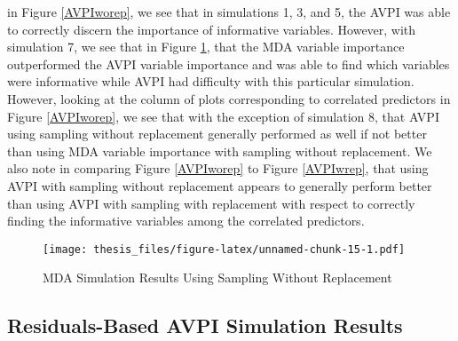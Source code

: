 \documentclass[12pt,twoside]{reedthesis}
\theoremstyle{definition}
\theoremstyle{definition}
\theoremstyle{definition}
\theoremstyle{remark}
\begin{document}
in Figure \ref{AVPIworep}, we see that in simulations 1, 3, and 5, the
AVPI was able to correctly discern the importance of informative
variables. However, with simulation 7, we see that in Figure
\ref{MDAworep1}, that the MDA variable importance outperformed the AVPI
variable importance and was able to find which variables were
informative while AVPI had difficulty with this particular simulation.
However, looking at the column of plots corresponding to correlated
predictors in Figure \ref{AVPIworep}, we see that with the exception of
simulation 8, that AVPI using sampling without replacement generally
performed as well if not better than using MDA variable importance with
sampling without replacement. We also note in comparing Figure
\ref{AVPIworep} to Figure \ref{AVPIwrep}, that using AVPI with sampling
without replacement appears to generally perform better than using AVPI
with sampling with replacement with respect to correctly finding the
informative variables among the correlated predictors. \par
\begin{figure}
\centering
\texttt{[image: thesis\_files/figure-latex/unnamed-chunk-15-1.pdf]}
\caption{\label{fig:unnamed-chunk-15}\label{MDAworep1}MDA Simulation Results
Using Sampling Without Replacement}
\end{figure}
\subsection{Residuals-Based AVPI Simulation
Results}\label{residuals-based-avpi-simulation-results}
\end{document}
